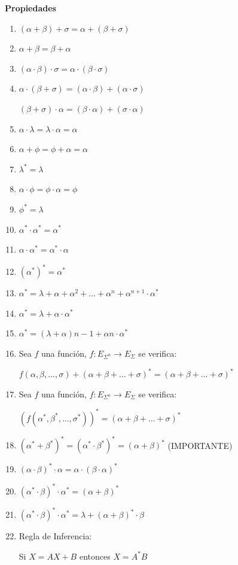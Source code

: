 \documentclass[12pt, twoside, openright]{report} %
\begin{document}
\textbf{Propiedades}
\begin{multicols}{2}
\begin{enumerate}
  \item $(\alpha+\beta)+\sigma = \alpha + (\beta + \sigma)$
  \item $\alpha + \beta = \beta + \alpha$
  \item $(\alpha \cdot \beta)\cdot\sigma = \alpha \cdot (\beta\cdot\sigma)$
  \item $\alpha \cdot (\beta +\sigma) = (\alpha \cdot \beta) + (\alpha \cdot \sigma)$
  
  $(\beta +\sigma) \cdot \alpha  = (\beta \cdot \alpha) + (\sigma \cdot \alpha)$
  \item $\alpha \cdot \lambda = \lambda \cdot \alpha = \alpha$
  \item $\alpha + \phi = \phi + \alpha = \alpha$
  \item $\lambda^* = \lambda$
  \item $\alpha \cdot \phi = \phi \cdot \alpha= \phi$
  \item $\phi^* = \lambda$
  \item $\alpha^* \cdot \alpha^* = \alpha^*$
  \item $\alpha \cdot \alpha^* = \alpha^* \cdot \alpha$
  \columnbreak
  \item $(\alpha^*)^*=\alpha^*$
  \item $\alpha^* = \lambda + \alpha + \alpha^2 + ... + \alpha^n + \alpha^{n+1} \cdot \alpha^*$
  \item $\alpha^* = \lambda + \alpha \cdot \alpha^*$
  \item $\alpha^* = (\lambda + \alpha)n-1 + \alpha n \cdot \alpha^*$
  \item Sea $f$ una función, $f: E_{\Sigma^n} \rightarrow E_\Sigma$ se verifica: 
  
  $f(\alpha, \beta, ..., \sigma) + (\alpha + \beta + ... + \sigma)^* = (\alpha + \beta + ... + \sigma)^*$

  \item Sea $f$ una función, $f: E_{\Sigma^n} \rightarrow E_\Sigma$ se verifica: 
  
  $(f(\alpha^*, \beta^*, ..., \sigma^*))^* = (\alpha + \beta + ... + \sigma)^*$

  \item $(\alpha^* + \beta^*)^* = (\alpha^* \cdot \beta^*)^* = (\alpha + \beta)^*$ (IMPORTANTE)
  \item $(\alpha \cdot \beta)^*\cdot \alpha = \alpha \cdot (\beta \cdot \alpha)^*$
  \item $(\alpha^* \cdot \beta)^*\cdot \alpha^* =(\alpha + \beta)^*$  
  \item $(\alpha^* \cdot \beta)^*\cdot \alpha^* = \lambda + (\alpha + \beta)^*\cdot \beta$
  \item Regla de Inferencia: 
  
  Si $X=AX+B$ entonces $X=A^*B$
\end{enumerate}
\end{multicols}
\end{document}
